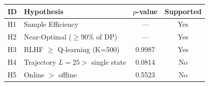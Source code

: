 \begin{tabular}{llcc}
\toprule
ID & Hypothesis & $p$-value & Supported \\
\midrule
H1 & Sample Efficiency & --- & Yes \\
H2 & Near-Optimal ($\geq 90\%$ of DP) & --- & Yes \\
H3 & RLHF $\geq$ Q-learning (K=500) & 0.9987 & Yes \\
H4 & Trajectory $L{=}25 >$ single state & 0.0814 & No \\
H5 & Online $>$ offline & 0.5523 & No \\
\bottomrule
\end{tabular}